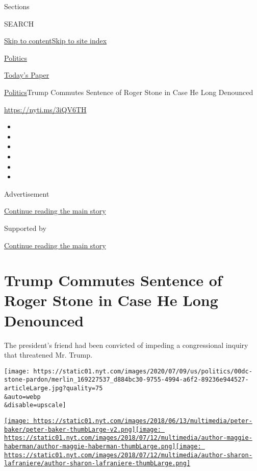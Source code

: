 Sections

SEARCH

\protect\hyperlink{site-content}{Skip to
content}\protect\hyperlink{site-index}{Skip to site index}

\href{https://www.nytimes.com/section/politics}{Politics}

\href{https://myaccount.nytimes.com/auth/login?response_type=cookie\&client_id=vi}{}

\href{https://www.nytimes.com/section/todayspaper}{Today's Paper}

\href{/section/politics}{Politics}\textbar{}Trump Commutes Sentence of
Roger Stone in Case He Long Denounced

\url{https://nyti.ms/3iQV6TH}

\begin{itemize}
\item
\item
\item
\item
\item
\item
\end{itemize}

Advertisement

\protect\hyperlink{after-top}{Continue reading the main story}

Supported by

\protect\hyperlink{after-sponsor}{Continue reading the main story}

\hypertarget{trump-commutes-sentence-of-roger-stone-in-case-he-long-denounced}{%
\section{Trump Commutes Sentence of Roger Stone in Case He Long
Denounced}\label{trump-commutes-sentence-of-roger-stone-in-case-he-long-denounced}}

The president's friend had been convicted of impeding a congressional
inquiry that threatened Mr. Trump.

\texttt{[image: https://static01.nyt.com/images/2020/07/09/us/politics/00dc-stone-pardon/merlin\_169227537\_d884bc30-9755-4994-a6f2-89236e944527-articleLarge.jpg?quality=75\\\&auto=webp\\\&disable=upscale]}

\href{https://www.nytimes.com/by/peter-baker}{\texttt{[image: https://static01.nyt.com/images/2018/06/13/multimedia/peter-baker/peter-baker-thumbLarge-v2.png]}}\href{https://www.nytimes.com/by/maggie-haberman}{\texttt{[image: https://static01.nyt.com/images/2018/07/12/multimedia/author-maggie-haberman/author-maggie-haberman-thumbLarge.png]}}\href{https://www.nytimes.com/by/sharon-lafraniere}{\texttt{[image: https://static01.nyt.com/images/2018/07/12/multimedia/author-sharon-lafraniere/author-sharon-lafraniere-thumbLarge.png]}}

